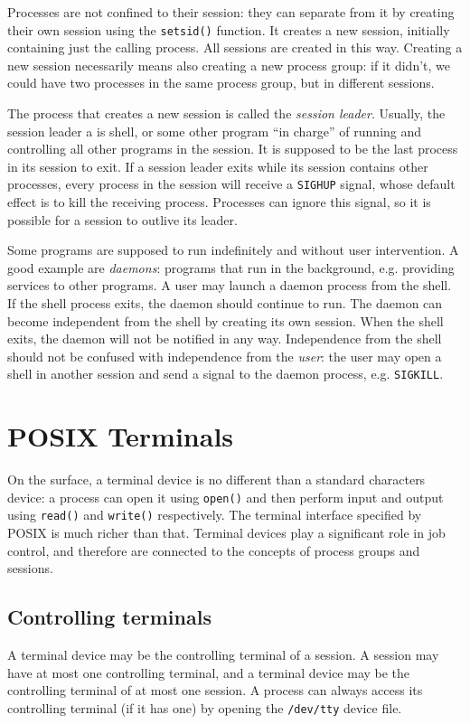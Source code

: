 \documentclass[shortabstract, manyadvisors, english, mgr]{iithesis}
\begin{document}
Processes are not confined to their session: they can separate from it by
creating their own session using the \texttt{setsid()} function. It creates a
new session, initially containing just the calling process. All sessions are
created in this way. Creating a new session necessarily means also creating a
new process group: if it didn't, we could have two processes in the same process
group, but in different sessions.

The process that creates a new session is called the \textit{session leader}.
Usually, the session leader a is shell, or some other program ``in charge'' of
running and controlling all other programs in the session. It is supposed to
be the last process in its session to exit. If a session leader exits while its
session contains other processes, every process in the session will receive a
\texttt{SIGHUP} signal, whose default effect is to kill the receiving process.
Processes can ignore this signal, so it is possible for a session to outlive its
leader.

Some programs are supposed to run indefinitely and without user intervention.
A good example are \textit{daemons}: programs that run in the background, e.g.
providing services to other programs. A user may launch a daemon process from
the shell. If the shell process exits, the daemon should continue to run.
The daemon can become independent from the shell by creating its own session.
When the shell exits, the daemon will not be notified in any way.
Independence from the shell should not be confused with independence from the
\textit{user}: the user may open a shell in another session and send a signal to
the daemon process, e.g. \texttt{SIGKILL}.

\section{POSIX Terminals}
On the surface, a terminal device is no different than a standard characters
device: a process can open it using \texttt{open()} and then perform input and
output using \texttt{read()} and \texttt{write()} respectively.
The terminal interface specified by POSIX is much richer than that. Terminal
devices play a significant role in job control, and therefore are connected to
the concepts of process groups and sessions.

\subsection{Controlling terminals}
A terminal device may be the controlling terminal of a session. A session may
have at most one controlling terminal, and a terminal device may be the controlling
terminal of at most one session. A process can always access its controlling
terminal (if it has one) by opening the \texttt{/dev/tty} device file.
\end{document}

